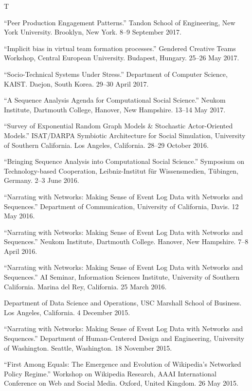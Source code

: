 \documentclass{cv}
\begin{document}
\begin{entries}{T}
		\item ``Peer Production Engagement Patterns.'' Tandon School of Engineering, New York University. Brooklyn, New York. 8--9 September 2017.
		\item ``Implicit bias in virtual team formation processes.'' Gendered Creative Teams Workshop, Central European University. Budapest, Hungary. 25--26 May 2017.
		\item ``Socio-Technical Systems Under Stress.'' Department of Computer Science, KAIST. Daejon, South Korea. 29--30 April 2017.
		\item ``A Sequence Analysis Agenda for Computational Social Science.'' Neukom Institute, Dartmouth College, Hanover, New Hampshire. 13--14 May 2017.
		\item ``Survey of Exponential Random Graph Models \& Stochastic Actor-Oriented Models.'' ISAT\slash DARPA Symbiotic Architecture for Social Simulation, University of Southern California. Los Angeles, California. 28--29 October 2016.
		\item ``Bringing Sequence Analysis into Computational Social Science.'' Symposium on Tech\-nol\-ogy-based Cooperation, Leibniz-Institut f\"{u}r Wissensmedien, T\"{u}bingen, Germany. 2--3 June 2016.
		\item ``Narrating with Networks: Making Sense of Event Log Data with Networks and Sequences.'' Department of Communication, University of California, Davis. 12 May 2016.
		\item ``Narrating with Networks: Making Sense of Event Log Data with Networks and Sequences.'' Neukom Institute, Dartmouth College. Hanover, New Hampshire. 7--8 April 2016.
		\item ``Narrating with Networks: Making Sense of Event Log Data with Networks and Sequences.'' AI Seminar, Information Sciences Institute, University of Southern California. Marina del Rey, California. 25 March 2016.
		\item Department of Data Science and Operations, USC Marshall School of Business. Los Angeles, California. 4 December 2015.
		\item ``Narrating with Networks: Making Sense of Event Log Data with Networks and Sequences.'' Department of Human-Centered Design and Engineering, University of Washington. Seattle, Washington. 18 November 2015.
		\item ``First Among Equals: The Emergence and Evolution of Wikipedia's Networked Policy Regime.'' Workshop on Wikipedia Research, AAAI International Conference on Web and Social Media. Oxford, United Kingdom. 26 May 2015.

\end{entries}
\end{document}
